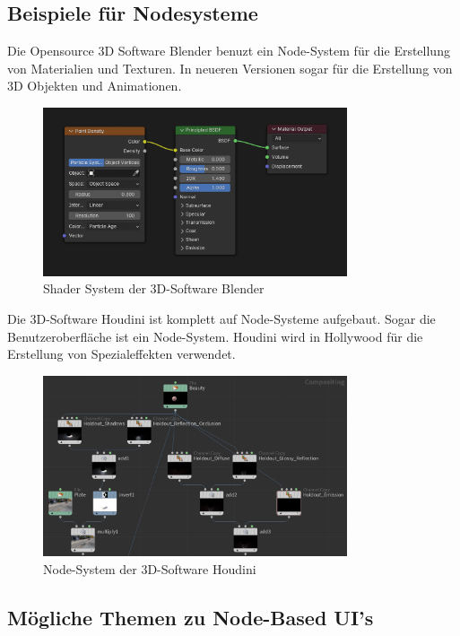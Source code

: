 \documentclass{article}
\begin{document}
\pagebreak


\subsection{Beispiele für Nodesysteme}

Die Opensource 3D Software Blender benuzt ein Node-System für die Erstellung von Materialien und Texturen. In neueren Versionen sogar für die Erstellung von 3D Objekten und Animationen.

\begin{figure}[h]
\centering
\includegraphics[width=0.8\textwidth]{ideas/blender-shader.png}
\caption{Shader System der 3D-Software Blender}
\end{figure}

Die 3D-Software Houdini ist komplett auf Node-Systeme aufgebaut. Sogar die Benutzeroberfläche ist ein Node-System. Houdini wird in Hollywood für die Erstellung von Spezialeffekten verwendet.

\begin{figure}[!ht]
\centering
\includegraphics[width=0.8\textwidth]{ideas/houdini-nodes.jpg}
\caption{Node-System der 3D-Software Houdini}
\end{figure}

\subsection{Mögliche Themen zu Node-Based UI's}
\end{document}
